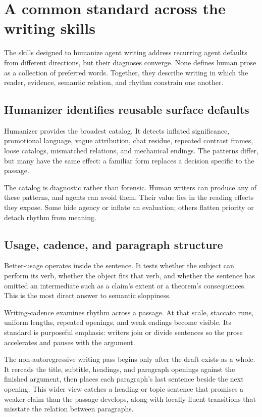 \section{A common standard across the writing skills}
\label{sec:revision}

The skills designed to humanize agent writing address recurring agent defaults
from different directions, but their diagnoses converge. None defines human
prose as a collection of preferred words. Together, they describe writing in
which the reader, evidence, semantic relation, and rhythm constrain one
another.

\subsection{Humanizer identifies reusable surface defaults}

Humanizer provides the broadest catalog. It detects inflated significance,
promotional language, vague attribution, chat residue, repeated contrast
frames, loose catalogs, mismatched relations, and mechanical endings. The
patterns differ, but many have the same effect: a familiar form replaces a
decision specific to the passage.

The catalog is diagnostic rather than forensic. Human writers can produce any
of these patterns, and agents can avoid them. Their value lies in the reading
effects they expose. Some hide agency or inflate an evaluation; others flatten
priority or detach rhythm from meaning.

\subsection{Usage, cadence, and paragraph structure}

Better-usage operates inside the sentence. It tests whether the subject can
perform its verb, whether the object fits that verb, and whether the sentence
has omitted an intermediate such as a claim's extent or a theorem's
consequences. This is the most direct answer to semantic sloppiness.

Writing-cadence examines rhythm across a passage. At that scale, staccato runs,
uniform lengths, repeated openings, and weak endings become visible. Its
standard is purposeful emphasis: writers join or divide sentences so the prose
accelerates and pauses with the argument.

The non-autoregressive writing pass begins only after the draft exists as a
whole. It rereads the title, subtitle, headings, and paragraph openings against
the finished argument, then places each paragraph's last sentence beside the
next opening. This wider view catches a heading or topic sentence that promises
a weaker claim than the passage develops, along with locally fluent
transitions that misstate the relation between paragraphs.

